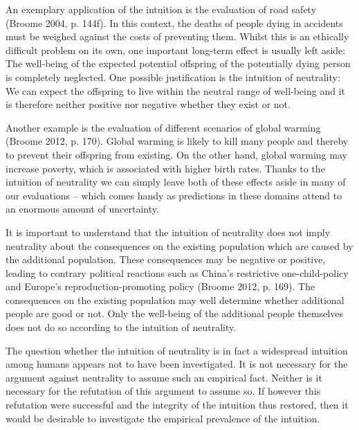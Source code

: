 An exemplary application of the intuition is the evaluation of road safety (\label{ref:RNDiZrz5y32ax}Broome 2004, p. 144f). In this context, the deaths of people dying in accidents must be weighed against the costs of preventing them. Whilst this is an ethically difficult problem on its own, one important long-term effect is usually left aside: The well-being of the expected potential offspring of the potentially dying person is completely neglected. One possible justification is the intuition of neutrality: We can expect the offspring to live within the neutral range of well-being and it is therefore neither positive nor negative whether they exist or not.  

Another example is the evaluation of different scenarios of global warming (\label{ref:RNDoULCN0LnjP}Broome 2012, p. 170). Global warming is likely to kill many people and thereby to prevent their offspring from existing. On the other hand, global warming may increase poverty, which is associated with higher birth rates. Thanks to the intuition of neutrality we can simply leave both of these effects aside in many of our evaluations – which comes handy as predictions in these domains attend to an enormous amount of uncertainty.  

It is important to understand that the intuition of neutrality does not imply neutrality about the consequences on the existing population which are caused by the additional population. These consequences may be negative or positive, leading to contrary political reactions such as China’s restrictive one-child-policy and Europe’s reproduction-promoting policy (\label{ref:RNDXP2aYAu98y}Broome 2012, p. 169). The consequences on the existing population may well determine whether additional people are good or not. Only the well-being of the additional people themselves does not do so according to the intuition of neutrality.  

The question whether the intuition of neutrality is in fact a widespread intuition among humans appears not to have been investigated. It is not necessary for the argument against neutrality to assume such an empirical fact. Neither is it necessary for the refutation of this argument to assume so. If however this refutation were successful and the integrity of the intuition thus restored, then it would be desirable to investigate the empirical prevalence of the intuition.  